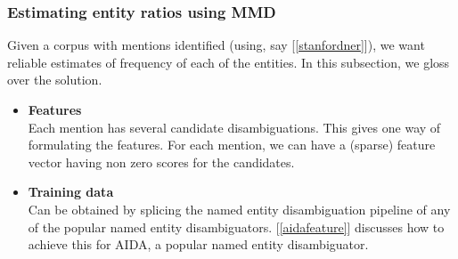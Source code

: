 \subsubsection{Estimating entity ratios using MMD}
Given a corpus with mentions identified (using, say [\ref{stanfordner}]), we want
reliable estimates of frequency of each of the entities. In this subsection, we gloss over the solution.
\begin{itemize}
\item \textbf{Features}  \\ Each mention has several candidate disambiguations. This gives one way of 
formulating the features. For each mention, we can have a (sparse) feature vector having non zero scores
for the candidates.
\item \textbf{Training data} \\ Can be obtained by splicing the named entity disambiguation pipeline of 
any of the popular named entity disambiguators. [\ref{aidafeature}] discusses how to achieve this for AIDA,
a popular named entity disambiguator. 
\end{itemize}




